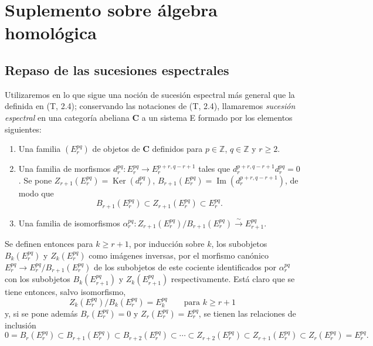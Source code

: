 \section{Suplemento sobre álgebra homológica}
\label{section:0.11}
\label{section:0.11-fr}

\subsection{Repaso de las sucesiones espectrales}
\label{subsection:0.11.1}
\label{subsection:0.11.1-fr}

\begin{env}[11.1.1]
\label{0.11.1.1-fr}
Utilizaremos en lo que sigue una noción de sucesión espectral más general que
la definida en (T, 2.4); conservando las notaciones de (T, 2.4),
llamaremos \emph{sucesión espectral} en una categoría abeliana $\boldsymbol{C}$ a un
sistema E formado por los elementos siguientes:
\begin{enumerate}
  \item[$a)$] Una familia $(E_r^{pq})$ de objetos de $\boldsymbol{C}$ definidos para
    $p\in\mathbb Z$, $q\in\mathbb Z$ y $r\geq2$.
  \item[$b)$] Una familia de morfismos
    $d_r^{pq}:E_r^{pq}\to E_r^{p+r,q-r+1}$ tales que
    $d_r^{p+r,q-r+1}d_r^{pq}=0$. Se pone
    $Z_{r+1}(E_r^{pq})=\operatorname{Ker}(d_r^{pq})$,
    $B_{r+1}(E_r^{pq})=\operatorname{Im}(d_r^{p+r,q-r+1})$, de modo que
    \[
      B_{r+1}(E_r^{pq})\subset Z_{r+1}(E_r^{pq})\subset E_r^{pq}.
    \]
  \item[$c)$] Una familia de isomorfismos
    $\alpha_r^{pq}:Z_{r+1}(E_r^{pq})/B_{r+1}(E_r^{pq})
    \xrightarrow{\sim}E_{r+1}^{pq}$.
\end{enumerate}

Se definen entonces para $k\geq r+1$, por inducción sobre $k$, los subobjetos
$B_k(E_r^{pq})$ y $Z_k(E_r^{pq})$ como imágenes inversas, por el morfismo
canónico $E_r^{pq}\to E_r^{pq}/B_{r+1}(E_r^{pq})$ de los subobjetos de este
cociente identificados por $\alpha_r^{pq}$ con los subobjetos $B_k(E_{r+1}^{pq})$ y
$Z_k(E_{r+1}^{pq})$ respectivamente. Está claro que se tiene entonces, salvo
isomorfismo,
\[
\label{0.11.1.1.1-fr}
  Z_k(E_r^{pq})/B_k(E_r^{pq})=E_k^{pq}
  \qquad\text{para }k\geq r+1
  \tag{11.1.1.1}
\]
y, si se pone además $B_r(E_r^{pq})=0$ y $Z_r(E_r^{pq})=E_r^{pq}$, se tienen
las relaciones de inclusión
\[
\label{0.11.1.1.2-fr}
  0=B_r(E_r^{pq})\subset B_{r+1}(E_r^{pq})\subset B_{r+2}(E_r^{pq})
  \subset\cdots\subset Z_{r+2}(E_r^{pq})\subset Z_{r+1}(E_r^{pq})
  \subset Z_r(E_r^{pq})=E_r^{pq}.
  \tag{11.1.1.2}
\]


\end{env}
